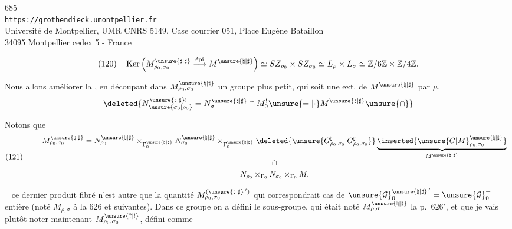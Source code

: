 
\begin{center}
685\\
\texttt{https://grothendieck.umontpellier.fr}\\
Université de Montpellier, UMR CNRS 5149, Case courrier 051, Place Eugène Bataillon\\
34095 Montpellier cedex 5 - France
\end{center}



\[
(120)\quad
\operatorname{Ker}\left(
M_{\rho_0,\sigma_0}^{\unsure{\natural|\sharp}}
\overset{\text{épi}}{\longrightarrow}M^{\unsure{\natural|\sharp}}
\right)
\simeq SZ_{\rho_0}\times SZ_{\sigma_0}
\simeq L_\rho\times L_\sigma
\simeq \mathbb Z/6\mathbb Z\times\mathbb Z/4\mathbb Z .
\]

Nous allons améliorer  la \uline{},
en découpant dans $M_{\rho_0,\sigma_0}^{\unsure{\natural|\sharp}}$
un groupe  plus petit, qui soit une ext. de
$M^{\unsure{\natural|\sharp}}$ par $\mu$.
\[
\deleted{
N_{\unsure{\sigma_0|\rho_0}}^{\unsure{\natural|\sharp}!}
=N_{\sigma}^{\unsure{\natural|\sharp}}\cap M_0^!
\unsure{=|\cdot}M^{\unsure{\natural|\sharp}}\unsure{\cap}
}
\]

\unsure{(}

Notons que
\[
(121)\qquad
\begin{array}{c}
M_{\rho_0,\sigma_0}^{\unsure{\natural|\sharp}}
=N_{\rho_0}^{\unsure{\natural|\sharp}}
\times_{\Gamma_0^{\unsure{\natural|\sharp}}}
N_{\sigma_0}^{\unsure{\natural|\sharp}}
\times_{\Gamma_0^{\unsure{\natural|\sharp}}}
\deleted{\unsure{G_{\rho_0,\sigma_0}^{\natural}|G_{\rho_0,\sigma_0}^{\sharp}}}
\underbrace{\inserted{\unsure{G|M}_{\rho_0,\sigma_0}^{\unsure{\natural|\sharp}}}}
 _{M^{\unsure{\natural|\sharp}}}\\[5pt]
\cap\\[3pt]
N_{\rho_0}\times_{\Gamma_0}N_{\sigma_0}\times_{\Gamma_0}M .
\end{array}
\]

\  ce dernier produit fibré n'est autre que la
quantité $M_{\rho_0,\sigma_0}^{(\unsure{\natural|\sharp}\,')}$
qui correspondrait  cas
de $\unsure{\mathcal G}_0^{\unsure{\natural|\sharp}\,'}
=\unsure{\mathcal G}_0^+$  entière
(noté $M_{\rho,\sigma}$ à la  626 et suivantes).
Dans ce groupe on a défini le sous-groupe, qui était noté
$M_{\rho,\sigma}^{\unsure{\natural|\sharp}}$
 la p.\ $626'$,
et que je vais plutôt noter maintenant
$M_{\rho_0,\sigma_0}^{\unsure{?|!}}$, défini comme

